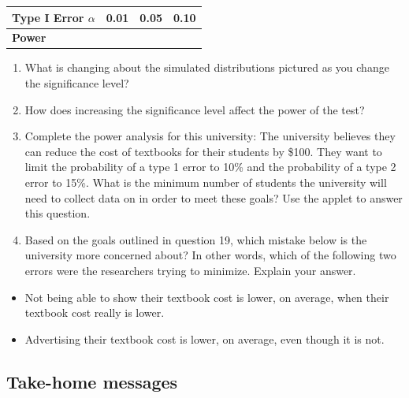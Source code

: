 \documentclass[
]{report}
\begin{document}
\setlength\tabcolsep{0.5cm}
\begin{longtable}{|l|c|c|c|}
\hline
\textbf{Type I Error $\alpha$}& 0.01 & 0.05 & 0.10 \\ \hline
\textbf{Power} & & &  \\ \hline
\end{longtable}

\begin{enumerate}
\def\labelenumi{\arabic{enumi}.}
\setcounter{enumi}{16}
\item
  What is changing about the simulated distributions pictured as you change the significance level?
  \vspace{0.6in}
\item
  How does increasing the significance level affect the power of the test?
  \vspace{0.6in}
\item
  Complete the power analysis for this university: The university believes they can reduce the cost of textbooks for their students by \$100. They want to limit the probability of a type 1 error to 10\% and the probability of a type 2 error to 15\%. What is the minimum number of students the university will need to collect data on in order to meet these goals? Use the applet to answer this question.
  \vspace{0.4in}
\item
  Based on the goals outlined in question 19, which mistake below is the university more concerned about? In other words, which of the following two errors were the researchers trying to minimize. Explain your answer.
\end{enumerate}

\begin{itemize}
\item
  Not being able to show their textbook cost is lower, on average, when their textbook cost really is lower.
\item
  Advertising their textbook cost is lower, on average, even though it is not.
\end{itemize}

\vspace{0.8in}

\subsection{Take-home messages}\label{take-home-messages-12}
\end{document}
